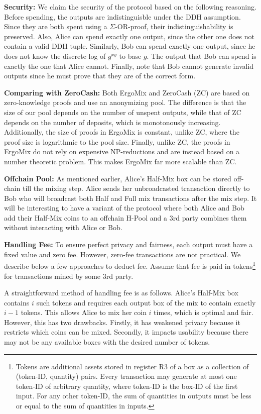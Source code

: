 \documentclass[11pt]{article}
\newcommand{\mixname}{ErgoMix\xspace}
\begin{document}
\textbf{Security:} We claim the security of the protocol based on the following reasoning. Before spending, the outputs are indistinguisble under the DDH assumption. Since they are both spent using a $\Sigma$-OR-proof, their indistinguishability is preserved. Also, Alice can spend exactly one output, since the other one does not contain a valid DDH tuple. Similarly, Bob can spend exactly one output, since he does not know the discrete log of $g^{xy}$ to base $g$. The output that Bob can spend is exactly the one that Alice cannot. Finally, note that Bob cannot generate invalid outputs since he must prove that they are of the correct form. 

\textbf{Comparing with ZeroCash:} Both \mixname and ZeroCash (ZC) are based on zero-knowledge proofs and use an anonymizing pool. The difference is that the size of our pool depends on the number of unspent outputs, while that of ZC depends on the number of deposits, which is monotonously increasing. Additionally, the size of proofs in \mixname is constant, unlike ZC, where the proof size is logarithmic to the pool size. Finally, unlike ZC, the proofs in \mixname do not rely on expensive NP-reductions and are instead based on a number theoretic problem. This makes \mixname far more scalable than ZC. 

\textbf{Offchain Pool:} As mentioned earlier, Alice's Half-Mix box can be stored off-chain till the mixing step. Alice sends her unbroadcasted transaction directly to Bob who will broadcast both Half and Full mix transactions after the mix step. It will be interesting to have a variant of the protocol where both Alice and Bob add their Half-Mix coins to an offchain H-Pool and a 3rd party combines them without interacting with Alice or Bob. 

\textbf{Handling Fee:} To ensure perfect privacy and fairness, each output must have a fixed value and zero fee. However, zero-fee transactions are not practical. We describe below a few approaches to deduct fee. 
Assume that fee is paid in tokens\footnote{Tokens are additional assets stored in register R3 of a box as a collection of (token-ID, quantity) pairs. Every transaction may generate at most one token-ID of arbitrary quantity, where token-ID is the box-ID of the first input. For any other token-ID, the sum of quantities in outputs must be less or equal to the sum of quantities in inputs.} for transactions mined by some 3rd party. 

 A straightforward method of handling fee is as follows. Alice's Half-Mix box contains $i$ such tokens and requires each output box of the mix to contain exactly $i-1$ tokens. This allows Alice to mix her coin $i$ times, which is optimal and fair. However, this has two drawbacks. Firstly, it has weakened privacy because it restricts which coins can be mixed. Secondly, it impacts usability because there may not be any available boxes with the desired number of tokens. %
 
\end{document}
